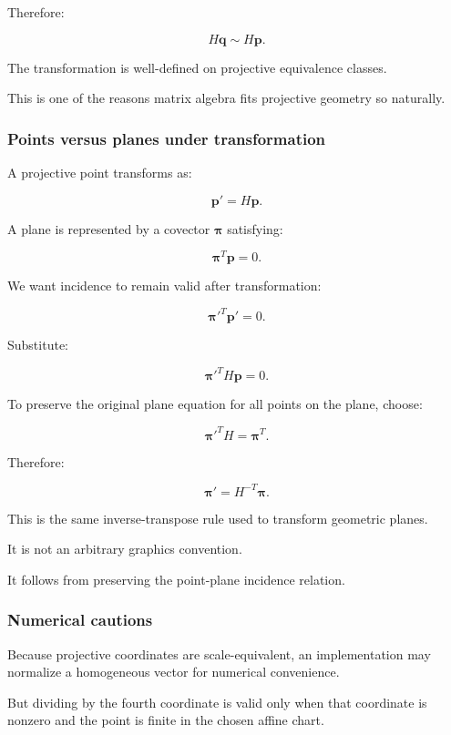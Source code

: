 Therefore:

\[
 \boxed{ H\mathbf q\sim H\mathbf p }.
\]

The transformation is well-defined on projective equivalence classes.

This is one of the reasons matrix algebra fits projective geometry so naturally.

\subsubsection{Points versus planes under transformation}\label{02-foundations-ii-ch032-points-versus-planes-under-transformation}

A projective point transforms as:

\[
 \boxed{ \mathbf p'=H\mathbf p }.
\]

A plane is represented by a covector \(\boldsymbol\pi\) satisfying:

\[
 \boldsymbol\pi^T\mathbf p=0.
\]

We want incidence to remain valid after transformation:

\[
 \boldsymbol\pi'^T\mathbf p'=0.
\]

Substitute:

\[
 \boldsymbol\pi'^TH\mathbf p=0.
\]

To preserve the original plane equation for all points on the plane, choose:

\[
 \boldsymbol\pi'^TH=\boldsymbol\pi^T.
\]

Therefore:

\[
 \boxed{ \boldsymbol\pi'=H^{-T}\boldsymbol\pi }.
\]

This is the same inverse-transpose rule used to transform geometric planes.

It is not an arbitrary graphics convention.

It follows from preserving the point-plane incidence relation.

\subsubsection{Numerical cautions}\label{02-foundations-ii-ch032-numerical-cautions}

Because projective coordinates are scale-equivalent, an implementation may normalize a homogeneous vector for numerical convenience.

But dividing by the fourth coordinate is valid only when that coordinate is nonzero and the point is finite in the chosen affine chart.

